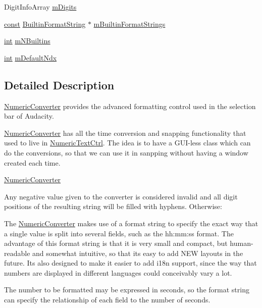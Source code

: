 \begin{DoxyCompactItemize}
\item 
Digit\+Info\+Array \hyperlink{class_numeric_converter_ab88999aa38ecf654f6f0da79ea3f9dcc}{m\+Digits}
\item 
\hyperlink{getopt1_8c_a2c212835823e3c54a8ab6d95c652660e}{const} \hyperlink{struct_builtin_format_string}{Builtin\+Format\+String} $\ast$ \hyperlink{class_numeric_converter_a23cf31487edd5025c2d6d7307d3b8a74}{m\+Builtin\+Format\+Strings}
\item 
\hyperlink{xmltok_8h_a5a0d4a5641ce434f1d23533f2b2e6653}{int} \hyperlink{class_numeric_converter_a68ce46f15383844f18d8aebc5c13d6ea}{m\+N\+Builtins}
\item 
\hyperlink{xmltok_8h_a5a0d4a5641ce434f1d23533f2b2e6653}{int} \hyperlink{class_numeric_converter_a5e2284c54a19173769adac4e3b22e43f}{m\+Default\+Ndx}
\end{DoxyCompactItemize}


\subsection{Detailed Description}
\hyperlink{class_numeric_converter}{Numeric\+Converter} provides the advanced formatting control used in the selection bar of Audacity. 

\hyperlink{class_numeric_converter}{Numeric\+Converter} has all the time conversion and snapping functionality that used to live in \hyperlink{class_numeric_text_ctrl}{Numeric\+Text\+Ctrl}. The idea is to have a G\+U\+I-\/less class which can do the conversions, so that we can use it in sanpping without having a window created each time.

\hyperlink{class_numeric_converter}{Numeric\+Converter}

Any negative value given to the converter is considered invalid and all digit positions of the resulting string will be filled with hyphens. Otherwise\+:

The \hyperlink{class_numeric_converter}{Numeric\+Converter} makes use of a format string to specify the exact way that a single value is split into several fields, such as the hh\+:mm\+:ss format. The advantage of this format string is that it is very small and compact, but human-\/readable and somewhat intuitive, so that it\textquotesingle{}s easy to add N\+EW layouts in the future. It\textquotesingle{}s also designed to make it easier to add i18n support, since the way that numbers are displayed in different languages could conceivably vary a lot.

The number to be formatted may be expressed in seconds, so the format string can specify the relationship of each field to the number of seconds.

